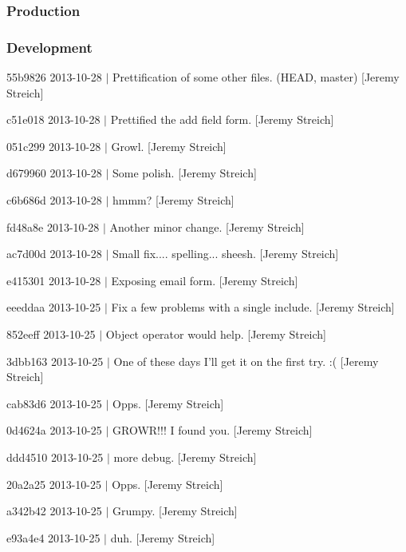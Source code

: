 \subsubsection*{Production}

\subsubsection*{Development}


\begin{DoxyItemize}
\item 55b9826 2013-\/10-\/28 $|$ Prettification of some other files. (H\-E\-A\-D, master) \mbox{[}Jeremy Streich\mbox{]}
\item c51e018 2013-\/10-\/28 $|$ Prettified the add field form. \mbox{[}Jeremy Streich\mbox{]}
\item 051c299 2013-\/10-\/28 $|$ Growl. \mbox{[}Jeremy Streich\mbox{]}
\item d679960 2013-\/10-\/28 $|$ Some polish. \mbox{[}Jeremy Streich\mbox{]}
\item c6b686d 2013-\/10-\/28 $|$ hmmm? \mbox{[}Jeremy Streich\mbox{]}
\item fd48a8e 2013-\/10-\/28 $|$ Another minor change. \mbox{[}Jeremy Streich\mbox{]}
\item ac7d00d 2013-\/10-\/28 $|$ Small fix.... spelling... sheesh. \mbox{[}Jeremy Streich\mbox{]}
\item e415301 2013-\/10-\/28 $|$ Exposing email form. \mbox{[}Jeremy Streich\mbox{]}
\item eeeddaa 2013-\/10-\/25 $|$ Fix a few problems with a single include. \mbox{[}Jeremy Streich\mbox{]}
\item 852eeff 2013-\/10-\/25 $|$ Object operator would help. \mbox{[}Jeremy Streich\mbox{]}
\item 3dbb163 2013-\/10-\/25 $|$ One of these days I'll get it on the first try. \-:( \mbox{[}Jeremy Streich\mbox{]}
\item cab83d6 2013-\/10-\/25 $|$ Opps. \mbox{[}Jeremy Streich\mbox{]}
\item 0d4624a 2013-\/10-\/25 $|$ G\-R\-O\-W\-R!!! I found you. \mbox{[}Jeremy Streich\mbox{]}
\item ddd4510 2013-\/10-\/25 $|$ more debug. \mbox{[}Jeremy Streich\mbox{]}
\item 20a2a25 2013-\/10-\/25 $|$ Opps. \mbox{[}Jeremy Streich\mbox{]}
\item a342b42 2013-\/10-\/25 $|$ Grumpy. \mbox{[}Jeremy Streich\mbox{]}
\item e93a4e4 2013-\/10-\/25 $|$ duh. \mbox{[}Jeremy Streich\mbox{]}

\end{DoxyItemize}
